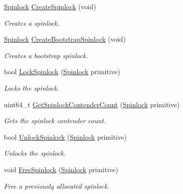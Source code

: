 \begin{DoxyCompactItemize}
\item 
\hyperlink{group__sync__hal_ga2b7bd1f01b65ccbfaee98f004746ae8b}{Spinlock} \hyperlink{group__sync__hal_ga7440216d123bf0558c35b31e5ec7f0ef}{Create\+Spinlock} (void)
\begin{DoxyCompactList}\small\item\em Creates a spinlock. \end{DoxyCompactList}\item 
\hyperlink{group__sync__hal_ga2b7bd1f01b65ccbfaee98f004746ae8b}{Spinlock} \hyperlink{group__sync__hal_ga39004a03f6873a1afac8bd26bbf97518}{Create\+Bootstrap\+Spinlock} (void)
\begin{DoxyCompactList}\small\item\em Creates a bootstrap spinlock. \end{DoxyCompactList}\item 
bool \hyperlink{group__sync__hal_ga8971920c153460f5f0937730dae6e882}{Lock\+Spinlock} (\hyperlink{group__sync__hal_ga2b7bd1f01b65ccbfaee98f004746ae8b}{Spinlock} primitive)
\begin{DoxyCompactList}\small\item\em Locks the spinlock. \end{DoxyCompactList}\item 
uint64\+\_\+t \hyperlink{group__sync__hal_ga4d90f4dd6818f04266c88072204cbf1d}{Get\+Spinlock\+Contender\+Count} (\hyperlink{group__sync__hal_ga2b7bd1f01b65ccbfaee98f004746ae8b}{Spinlock} primitive)
\begin{DoxyCompactList}\small\item\em Gets the spinlock contender count. \end{DoxyCompactList}\item 
bool \hyperlink{group__sync__hal_gae01c05d68d0a41e8dd03da6f7e2b8bbe}{Unlock\+Spinlock} (\hyperlink{group__sync__hal_ga2b7bd1f01b65ccbfaee98f004746ae8b}{Spinlock} primitive)
\begin{DoxyCompactList}\small\item\em Unlocks the spinlock. \end{DoxyCompactList}\item 
void \hyperlink{group__sync__hal_ga0422a587947623158b49f2fb924a2103}{Free\+Spinlock} (\hyperlink{group__sync__hal_ga2b7bd1f01b65ccbfaee98f004746ae8b}{Spinlock} primitive)
\begin{DoxyCompactList}\small\item\em Free a previously allocated spinlock. \end{DoxyCompactList}\item 

\end{DoxyCompactItemize}
